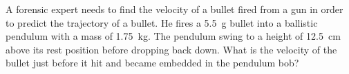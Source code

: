 %
%  
%
%
%
%
%
%  
%
%
%
%

\begin{example}
  A forensic expert needs to find the velocity of a bullet fired from a gun in
  order to predict the trajectory of a bullet. He fires a \SI{5.5}{\gram}
  bullet into a ballistic pendulum with a mass of \SI{1.75}{\kilo\gram}. The
  pendulum swing to a height of \SI{12.5}{\centi\metre} above its rest position
  before dropping back down. What is the velocity of the bullet just before it
  hit and became embedded in the pendulum bob?
  \begin{center}
  \end{center}
\end{example}



